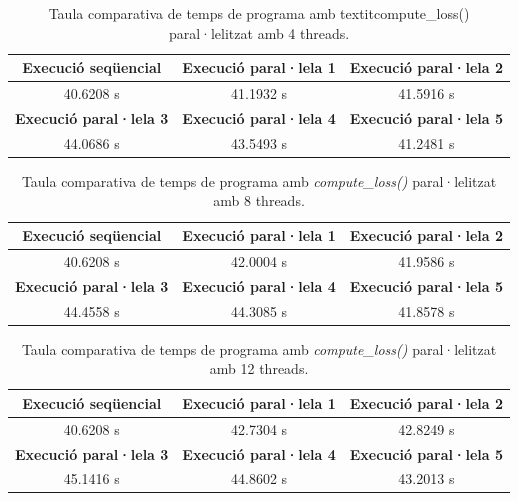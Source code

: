 \documentclass{article}
\begin{document}
\begin{table}[H]
    \centering
    \begin{tabular}{|c|c|c|}
        \hline
        \textbf{Execució seqüencial} & \textbf{Execució paral·lela 1} & \textbf{Execució paral·lela 2} \\ \hline
        40.6208 s & 41.1932 s & 41.5916 s \\ \hline
        \textbf{Execució paral·lela 3} & \textbf{Execució paral·lela 4} & \textbf{Execució paral·lela 5} \\ \hline
        44.0686 s & 43.5493 s & 41.2481 s \\ \hline
    \end{tabular}
    \caption{Taula comparativa de temps de programa amb textit{compute\_loss()} paral·lelitzat amb 4 threads.}
    \label{tab:f4_4trheads}
\end{table}

\begin{table}[H]
    \centering
    \begin{tabular}{|c|c|c|}
        \hline
        \textbf{Execució seqüencial} & \textbf{Execució paral·lela 1} & \textbf{Execució paral·lela 2} \\ \hline
        40.6208 s & 42.0004 s & 41.9586 s \\ \hline
        \textbf{Execució paral·lela 3} & \textbf{Execució paral·lela 4} & \textbf{Execució paral·lela 5} \\ \hline
        44.4558 s & 44.3085 s & 41.8578 s \\ \hline
    \end{tabular}
    \caption{Taula comparativa de temps de programa amb \textit{compute\_loss()} paral·lelitzat amb 8 threads.}
    \label{tab:f4_8trheads}
\end{table}

\begin{table}[H]
    \centering
    \begin{tabular}{|c|c|c|}
        \hline
        \textbf{Execució seqüencial} & \textbf{Execució paral·lela 1} & \textbf{Execució paral·lela 2} \\ \hline
        40.6208 s & 42.7304 s & 42.8249 s \\ \hline
        \textbf{Execució paral·lela 3} & \textbf{Execució paral·lela 4} & \textbf{Execució paral·lela 5} \\ \hline
        45.1416 s & 44.8602 s & 43.2013 s \\ \hline
    \end{tabular}
    \caption{Taula comparativa de temps de programa amb  \textit{compute\_loss()} paral·lelitzat amb 12 threads.}
    \label{tab:f4_12trheads}
\end{table}
\end{document}
